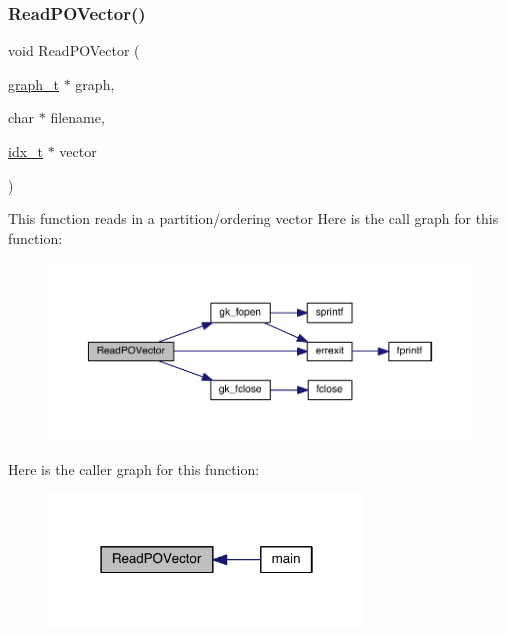 \subsubsection{\texorpdfstring{Read\+P\+O\+Vector()}{ReadPOVector()}}
{\footnotesize\ttfamily void Read\+P\+O\+Vector (\begin{DoxyParamCaption}\item[{\hyperlink{a00734}{graph\+\_\+t} $\ast$}]{graph,  }\item[{char $\ast$}]{filename,  }\item[{\hyperlink{a00876_aaa5262be3e700770163401acb0150f52}{idx\+\_\+t} $\ast$}]{vector }\end{DoxyParamCaption})}

This function reads in a partition/ordering vector Here is the call graph for this function\+:\nopagebreak
\begin{figure}[H]
\begin{center}
\leavevmode
\includegraphics[width=350pt]{a00858_a65a7c382444e5132dafddb75b6117754_cgraph}
\end{center}
\end{figure}
Here is the caller graph for this function\+:\nopagebreak
\begin{figure}[H]
\begin{center}
\leavevmode
\includegraphics[width=238pt]{a00858_a65a7c382444e5132dafddb75b6117754_icgraph}
\end{center}
\end{figure}
\mbox{\label{a00858_a12b940ccee061b8787088fbe16245f46}} 
